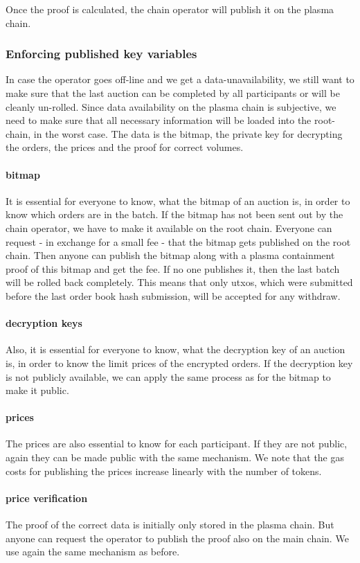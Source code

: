 \documentclass[11pt,parskip=full]{scrartcl}%
\begin{document}
Once the proof is calculated, the chain operator will publish it on the plasma chain. 


\subsubsection{Enforcing published key variables}
\label{enforceAvailablity}
In case the operator goes off-line and we get a data-unavailability, we still want to make sure that the last auction can be completed by all participants or will be cleanly un-rolled. Since data availability on the plasma chain is subjective, we need to make sure that all necessary information will be loaded into the root-chain, in the worst case.
The data is the bitmap, the private key for decrypting the orders, the prices and the proof for correct volumes.
\paragraph{bitmap} It is essential for everyone to know, what the bitmap of an auction is, in order to know which orders are in the batch. If the bitmap has not been sent out by the chain operator, we have to make it available on the root chain. Everyone can request - in exchange for a small fee - that the bitmap gets published on the root chain. Then anyone can publish the bitmap along with a plasma containment proof of this bitmap and get the fee. If no one publishes it, then the last batch will be rolled back completely. This means that only utxos, which were submitted before the last order book hash submission, will be accepted for any withdraw.
\paragraph{decryption keys} Also, it is essential for everyone to know, what the decryption key of an auction is, in order to know the limit prices of the encrypted orders. If the decryption key is not publicly available, we can apply the same process as for the bitmap to make it public.

\paragraph{prices} The prices are also essential to know for each participant. If they are not public, again they can be made public with the same mechanism. We note that the gas costs for publishing the prices increase linearly with the number of tokens.

\paragraph{price verification} The proof of the correct data is initially only stored in the plasma chain. But anyone can request the operator to publish the proof also on the main chain. We use again the same mechanism as before.
\end{document}
